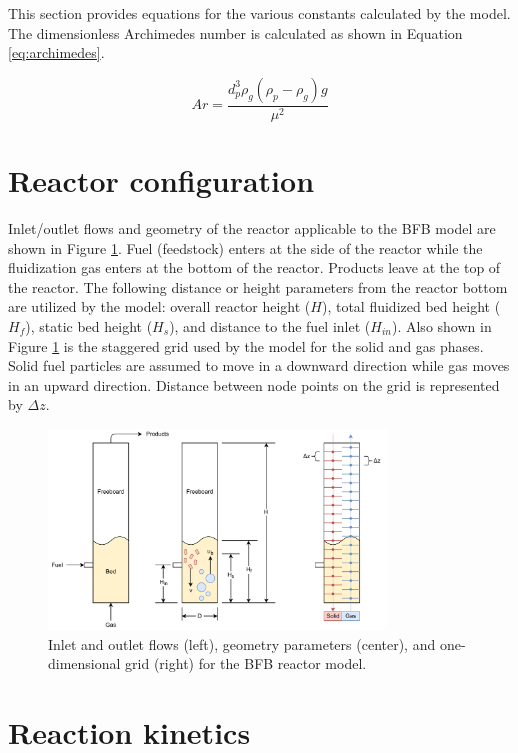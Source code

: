 \documentclass[12pt,titlepage]{article}
\begin{document}
This section provides equations for the various constants calculated by the model. The dimensionless Archimedes number is calculated as shown in Equation \ref{eq:archimedes}.

\begin{equation}\label{eq:archimedes}
    Ar = \frac{d_p^3 \rho_g (\rho_p - \rho_g) g}{\mu^2}
\end{equation}

\section{Reactor configuration}

Inlet/outlet flows and geometry of the reactor applicable to the BFB model are shown in Figure \ref{fig:grid}. Fuel (feedstock) enters at the side of the reactor while the fluidization gas enters at the bottom of the reactor. Products leave at the top of the reactor. The following distance or height parameters from the reactor bottom are utilized by the model: overall reactor height ($H$), total fluidized bed height ($H_f$), static bed height ($H_{s}$), and distance to the fuel inlet ($H_{in}$). Also shown in Figure \ref{fig:grid} is the staggered grid used by the model for the solid and gas phases. Solid fuel particles are assumed to move in a downward direction while gas moves in an upward direction. Distance between node points on the grid is represented by $\Delta z$.

\begin{figure}[ht]
    \centering
    \includegraphics[width=0.8\textwidth]{figures/grid.pdf}
    \caption{Inlet and outlet flows (left), geometry parameters (center), and one-dimensional grid (right) for the BFB reactor model.}
    \label{fig:grid}
\end{figure}

\section{Reaction kinetics}
\end{document}
